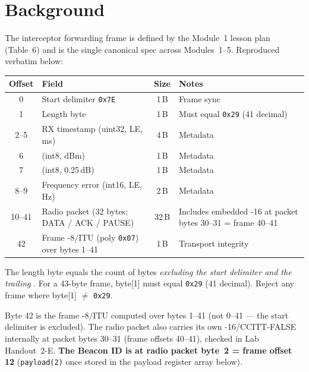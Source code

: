 \documentclass[11pt,letterpaper]{article}
\begin{document}
\section{Background}
The interceptor forwarding frame is defined by the Module~1 lesson plan (Table~6) and is the single canonical spec across Modules~1--5. Reproduced verbatim below:
\begin{center}
\begin{tabularx}{\textwidth}{@{}c l c X@{}}
\toprule
\textbf{Offset} & \textbf{Field} & \textbf{Size} & \textbf{Notes} \\
\midrule
0      & Start delimiter \texttt{0x7E}                            & 1\,B  & Frame sync \\
1      & Length byte                                              & 1\,B  & Must equal \texttt{0x29} (41 decimal) \\
2--5   & RX timestamp (uint32, \mbox{LE}, ms)                     & 4\,B  & Metadata \\
6      & \RSSI{} (int8, dBm)                                      & 1\,B  & Metadata \\
7      & \SNR{} (int8, 0.25\,dB)                                  & 1\,B  & Metadata \\
8--9   & Frequency error (int16, \mbox{LE}, Hz)                   & 2\,B  & Metadata \\
10--41 & Radio packet (32 bytes; DATA / ACK / PAUSE)              & 32\,B & Includes embedded \CRC{}-16 at packet bytes 30--31 = frame 40--41 \\
42     & Frame \CRC{}-8/ITU (poly \texttt{0x07}) over bytes 1--41 & 1\,B  & Transport integrity \\
\bottomrule
\end{tabularx}
\end{center}

\begin{tcolorbox}[infobox={Length-Field Rule}]
The length byte equals the count of bytes \emph{excluding the start delimiter and the trailing \CRC{}}. For a 43-byte frame, byte[1] must equal \texttt{0x29} (41 decimal). Reject any frame where byte[1] $\neq$ \texttt{0x29}.
\end{tcolorbox}

Byte 42 is the frame \CRC{}-8/ITU computed over bytes 1--41 (not 0--41 --- the start delimiter is excluded). The radio packet also carries its own \CRC{}-16/CCITT-FALSE internally at packet bytes 30--31 (frame offsets 40--41), checked in Lab Handout~2-E. \textbf{The Beacon ID is at radio packet byte~2 = frame offset 12} (\texttt{payload(2)} once stored in the payload register array below).
\end{document}
